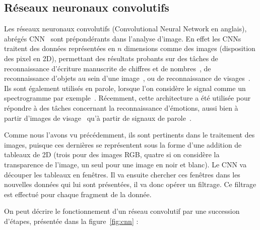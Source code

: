 \subsection{Réseaux neuronaux convolutifs}
Les réseaux neuronaux convolutifs (Convolutional Neural Network en anglais), abrégés CNN~\cite{LeCun1989} sont prépondérants dans l'analyse d'image. En effet les CNNs traitent des données représentées en $n$ dimensions comme des images (disposition des pixel en 2D), permettant des résultats probants sur des tâches de reconnaissance d'écriture manuscrite de chiffres et de nombres~\cite{LeCun1998}, de reconnaissance d'objets au sein d'une image~\cite{Traore2018}, ou de reconnaissance de visages~\cite{Liu2016}. Ils sont également utilisés en parole, lorsque l'on considère le signal comme un spectrogramme par exemple~\cite{Abdel2014}. Récemment, cette architecture a été utilisée pour répondre à des tâches concernant la reconnaissance d'émotions, aussi bien à partir d'images de visage~\cite{Pitaloka2017,Mehendale2020} qu'à partir de signaux de parole~\cite{Zhang2016}.



Comme nous l'avons vu précédemment, ils sont pertinents dans le traitement des images, puisque ces dernières se représentent sous la forme d'une addition de tableaux de 2D (trois pour des images RGB, quatre si on considère la transparence de l'image, un seul pour une image en noir et blanc).
Le CNN va découper les tableaux en fenêtres. Il va ensuite chercher ces fenêtres dans les nouvelles données qui lui sont présentées, il va donc opérer un filtrage. Ce filtrage est effectué pour chaque fragment de la donnée.

On peut décrire le fonctionnement d'un réseau convolutif par une succession d'étapes, présentée dans la figure~\ref{fig:cnn} :

